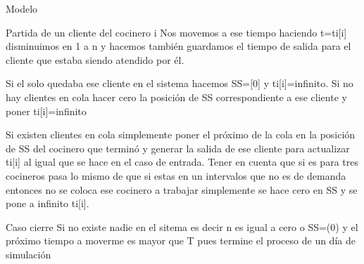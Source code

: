 \documentclass[]{article}
\begin{document}
\begin{section} {Modelo}
\begin{subsection} {Partida de un cliente del cocinero i}
	Nos movemos a ese tiempo haciendo t=ti[i] disminuimos en 1 a n y hacemos también guardamos el tiempo de salida para el cliente que estaba siendo atendido por \'{e}l.
	
	Si el solo quedaba ese cliente en el sistema hacemos SS=[0] y ti[i]=infinito.
	Si no hay clientes en cola hacer cero la posici\'{o}n de SS correspondiente a ese cliente y poner ti[i]=infinito
	
	Si existen clientes en cola simplemente poner el pr\'{o}ximo de la cola en la posici\'{o}n de SS del cocinero que termin\'{o} y generar la salida de ese cliente para actualizar ti[i] al igual que se hace en el caso de entrada. Tener en cuenta que si es para tres cocineros pasa lo mismo de que si estas en un intervalos que no es de demanda entonces no se coloca ese cocinero a trabajar simplemente se hace cero en SS y se pone a infinito ti[i].
	   

	
	
\end{subsection}
\begin{subsection} {Caso cierre}
	Si no existe nadie en el sitema es decir n es igual a cero o SS=(0) y el pr\'{o}ximo tiempo a moverme es mayor que T pues termine el proceso de un d\'{i}a de simulaci\'{o}n 
	
	
	
\end{subsection}



\end{section}
\end{document}
